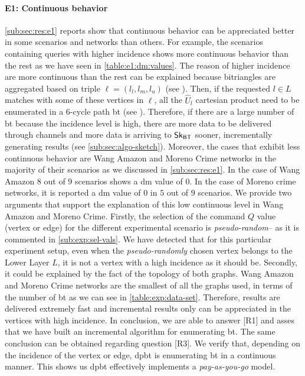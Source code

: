 \paragraph{E1: Continuous behavior} \autoref{sub:sec:res:e1} reports show that continuous behavior can be appreciated better in some scenarios and networks than others. For example, the scenarios containing queries with higher incidence shows more continuous behavior than the rest as we have seen in \autoref{table:e1:dm:values}. 
The reason of higher incidence are more continuous than the rest can be explained because bitriangles are aggregated based on triple $\ell = (l_l,l_m,l_u)$ (see ). Then, if the requested $l \in L$ matches with some of these vertices in $\ell$, all the $\hat{U}_l$ cartesian product need to be enumerated in a 6-cycle path \acrshort{bt} (see ). 
Therefore, if there are a large number of \acrshort{bt} because the incidence level is high, there are more data to be delivered through channels and more data is arriving to $\mathsf{Sk_{BT}}$ sooner, incrementally generating results (see \autoref{sub:sec:algo-sketch}).
Moreover, the cases that exhibit less continuous behavior are Wang Amazon and Moreno Crime networks in the majority of their scenarios as we discussed in \autoref{sub:sec:res:e1}. In the case of Wang Amazon $8$ out of $9$ scenarios shows a \acrshort{dm} value of $0$. In the case of Moreno crime networks, it is reported a \acrshort{dm} value of $0$ in $5$ out of $9$ scenarios. 
We provide two arguments that support the explanation of this low continuous level in Wang Amazon and Moreno Crime. 
Firstly, the selection of the command $Q$ value (vertex or edge) for the different experimental scenario is \emph{pseudo-random}-- as it is commented in \autoref{sub:exp:sel-vals}. 
We have detected that for this particular experiment setup, even when the \emph{pseudo-randomly} chosen vertex belongs to the Lower Layer $L$, it is not a vertex with a high incidence as it should be.
Secondly, it could be explained by the fact of the topology of both graphs. Wang Amazon and Moreno Crime networks are the smallest of all the graphs used, in terms of the number of \acrshort{bt} as we can see in \autoref{table:exp:data-set}.
Therefore, results are delivered extremely fast and incremental results only can be appreciated in the vertices with high incidence.
In conclusion, we are able to answer [R1] and asses that we have built an incremental algorithm for enumerating \acrlong{bt}. 
The same conclusion can be obtained regarding question [R3]. We verify that, depending on the incidence of the vertex or edge, \acrshort{dpbt} is enumerating \acrshort{bt} in a continuous manner. This shows us \acrshort{dpbt} effectively implements a \emph{pay-as-you-go} model.

